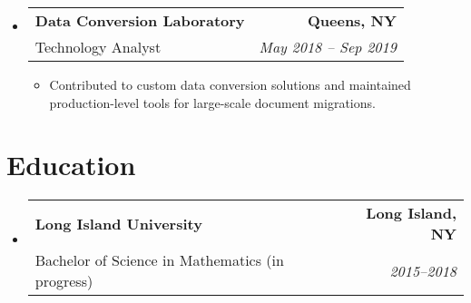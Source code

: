 \documentclass[a4paper]{article}
\makeatletter
\newcommand{\TwoRowSubheading}[4]{
  \item \begin{tabular*}{.95\textwidth}{@{}l @{\extracolsep{\fill}} r@{}}
    \textbf{#1} & \textbf{#2} \\
    {\color{gray}#3} & {\itshape #4} \\
  \end{tabular*}
}
\makeatother
\begin{document}
\begin{itemize}[leftmargin=*,label=]
\TwoRowSubheading
{Data Conversion Laboratory}
{Queens, NY}
{Technology Analyst}
{May 2018 -- Sep 2019}

\begin{itemize}[leftmargin=1em]
    \item Contributed to custom data conversion solutions and maintained production-level tools for large-scale document migrations.
\end{itemize}

\end{itemize}

\section{Education}
\begin{itemize}[leftmargin=*]    
\TwoRowSubheading
{Long Island University}
{Long Island, NY}
{Bachelor of Science in Mathematics (in progress)}
{2015--2018}
\end{itemize}
\end{document}
